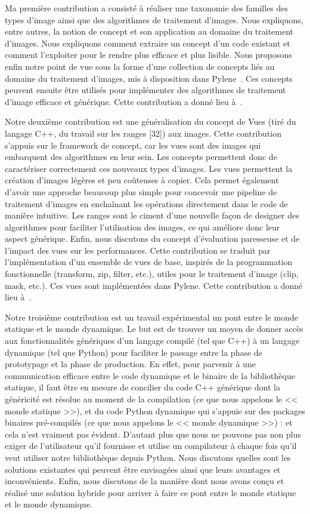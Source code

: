 \documentclass[11pt,a4paper,sans]{article} %
\begin{document}
Ma première contribution a consisté à réaliser une taxonomie des familles des types d'image ainsi que des algorithmes de
traitement d'images. Nous expliquons, entre autres, la notion de concept et son application au domaine du traitement
d'images. Nous expliquons comment extraire un concept d'un code existant et comment l'exploiter pour le rendre plus
efficace et plus lisible. Nous proposons enfin notre point de vue sous la forme d'une collection de concepts liés au
domaine du traitement d'images, mis à disposition dans Pylene~\parencite{carlinet.2018.pylene}. Ces concepts peuvent
ensuite être utilisés pour implémenter des algorithmes de traitement d'image efficace et générique. Cette contribution a
donné lieu à~\parencite{roynard.2019.rrpr}.

Notre deuxième contribution est une généralisation du concept de Vues (tiré du langage C++, du travail sur les ranges
  [32]) aux images. Cette contribution s'appuis sur le framework de concept, car les vues sont des images qui embarquent
des algorithmes en leur sein. Les concepts permettent donc de caractériser correctement ces nouveaux types d'images. Les
vues permettent la création d'images légères et peu coûteuses à copier. Cela permet également d'avoir une approche
beaucoup plus simple pour concevoir une pipeline de traitement d'images en enchaînant les opérations directement dans le
code de manière intuitive. Les ranges sont le ciment d'une nouvelle façon de designer des algorithmes pour faciliter
l'utilisation des images, ce qui améliore donc leur aspect générique. Enfin, nous discutons du concept d'évaluation
paresseuse et de l'impact des vues sur les performances. Cette contribution se traduit par l'implémentation d'un
ensemble de vues de base, inspirés de la programmation fonctionnelle (transform, zip, filter, etc.), utiles pour le
traitement d'image (clip, mask, etc.). Ces vues sont implémentées dans Pylene. Cette contribution a donné lieu
à~\parencite{roynard.2022.gpce}.

Notre troisième contribution est un travail expérimental un pont entre le monde statique et le monde dynamique. Le but
est de trouver un moyen de donner accès aux fonctionnalités génériques d'un langage compilé (tel que C++) à un langage
dynamique (tel que Python) pour faciliter le passage entre la phase de prototypage et la phase de production. En effet,
pour parvenir à une communication efficace entre le code dynamique et le binaire de la bibliothèque statique, il faut
être en mesure de concilier du code C++ générique dont la généricité est résolue au moment de la compilation (ce que
nous appelons le << monde statique >>), et du code Python dynamique qui s'appuie sur des packages binaires pré-compilés
(ce que nous appelons le << monde dynamique >>) : et cela n'est vraiment pas évident. D'autant plus que nous ne pouvons
pas non plus exiger de l'utilisateur qu'il fournisse et utilise un compilateur à chaque fois qu'il veut utiliser notre
bibliothèque depuis Python. Nous discutons quelles sont les solutions existantes qui peuvent être envisagées ainsi que
leurs avantages et inconvénients. Enfin, nous discutons de la manière dont nous avons conçu et réalisé une solution
hybride pour arriver à faire ce pont entre le monde statique et le monde dynamique.
\end{document}
